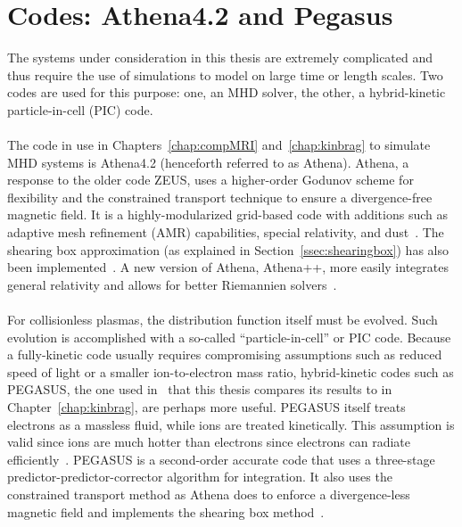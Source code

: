 \section{Codes: Athena4.2 and Pegasus} \label{sec:codes}
The systems under consideration in this thesis are extremely complicated and thus require the use of simulations to model on large time or length scales. Two codes are used for this purpose: one, an MHD solver, the other, a hybrid-kinetic particle-in-cell (PIC) code.\\
\\
The code in use in Chapters~\ref{chap:compMRI} and~\ref{chap:kinbrag} to simulate MHD systems is Athena4.2 (henceforth referred to as Athena). Athena, a response to the older code ZEUS, uses a higher-order Godunov scheme for flexibility and the constrained transport technique to ensure a divergence-free magnetic field. It is a highly-modularized grid-based code with additions such as adaptive mesh refinement (AMR) capabilities, special relativity, and dust~\cite{Stone2008,Stone2009}. The shearing box approximation (as explained in Section~\ref{ssec:shearingbox}) has also been implemented~\cite{Stone2010}. A new version of Athena, Athena++, more easily integrates general relativity and allows for better Riemannien solvers~\cite{White2016Thesis,White2016}.\\
\\
For collisionless plasmas, the distribution function itself must be evolved. Such evolution is accomplished with a so-called ``particle-in-cell'' or PIC code. Because a fully-kinetic code usually requires compromising assumptions such as reduced speed of light or a smaller ion-to-electron mass ratio, hybrid-kinetic codes such as PEGASUS, the one used in~\cite{Kunz2016} that this thesis compares its results to in Chapter~\ref{chap:kinbrag}, are perhaps more useful. PEGASUS itself treats electrons as a massless fluid, while ions are treated kinetically. This assumption is valid since ions are much hotter than electrons since electrons can radiate efficiently~\cite{Das2013}. PEGASUS is a second-order accurate code that uses a three-stage predictor-predictor-corrector algorithm for integration. It also uses the constrained transport method as Athena does to enforce a divergence-less magnetic field and implements the shearing box method~\cite{Kunz2014}. 

